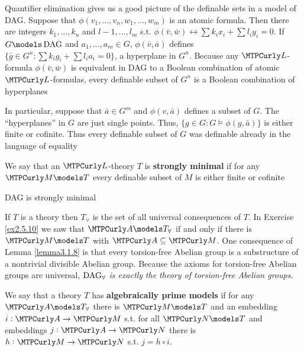 \documentclass[11pt]{article}
\begin{document}
Quantifier elimination gives us a good picture of the definable sets in
a model of DAG. Suppose that \(\phi(v_1,\dots,v_n,w_1,\dots,w_m)\) is an atomic
formula. Then there are integers \(k_1,\dots,k_n\) and \(l-1,\dots,l_m\) s.t.
\(\phi(\bar{v},\bar{w})\leftrightarrow\sum k_ix_i+\sum l_iy_i=0\). If \(G\models\DAG\) and
\(a_1,\dots,a_m\in G\), \(\phi(\bar{v},\bar{a})\) defines
\(\{\bar{g}\in G^n:\sum k_ig_i+\sum l_ia_i=0\}\), a hyperplane in \(G^n\). Because
any \(\call\)-formula \(\phi(\bar{v},\bar{w})\) is equivalent in DAG to a
Boolean combination of atomic \(\call\)-formulas, every definable subset of
\(G^n\) is a Boolean combination of hyperplanes

In particular, suppose that \(\bar{a}\in G^m\) and \(\phi(v,\bar{a})\) defines a
subset of \(G\). The ``hyperplanes'' in \(G\) are just single points. Thus,
\(\{g\in G:G\models\phi(g,\bar{a})\}\) is either finite or cofinite. Thus
every definable subset of \(G\) was definable already in the language of equality

\begin{definition}[]
We say that an \(\call\)-theory \(T\) is \textbf{strongly minimal} if for any
\(\calm\models T\) every definable subset of \(M\) is either finite or cofinite
\end{definition}

\begin{corollary}[]
DAG is strongly minimal
\end{corollary}


If \(T\) is a theory then \(T_\forall\) is the set of all universal consequences
of \(T\). In Exercise \ref{ex2.5.10} we saw that \(\cala\models T_\forall\) if and
only if there is \(\calm\models T\) with \(\cala\subseteq\calm\). One
consequence of Lemma \ref{lemma3.1.8} is that every torsion-free Abelian group
is a substructure of a nontrivial divisible Abelian group. Because the
axioms for torsion-free Abelian groups are universal, \emph{\(\operatorname{DAG}_\forall\) is exactly}
\emph{the theory of torsion-free Abelian groups.}

We say that a theory \(T\) has \textbf{algebraically prime models} if for any
\(\cala\models T_\forall\) there is \(\calm\models T\) and an embedding
\(i:\cala\to\calm\) s.t. for all \(\caln\models T\) and embeddings
\(j:\cala\to\caln\) there is \(h:\calm\to\caln\) s.t. \(j=h\circ i\).
\begin{center}
\end{center}
\end{document}
